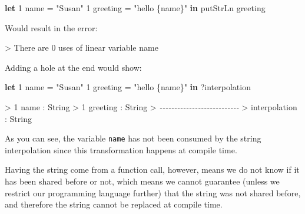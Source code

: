\documentclass[
]{article}
\newenvironment{Shaded}{}{}
\newcommand{\CommentTok}[1]{\textcolor[rgb]{0.38,0.63,0.69}{\textit{#1}}}
\newcommand{\DataTypeTok}[1]{\textcolor[rgb]{0.56,0.13,0.00}{#1}}
\newcommand{\DecValTok}[1]{\textcolor[rgb]{0.25,0.63,0.44}{#1}}
\newcommand{\FunctionTok}[1]{\textcolor[rgb]{0.02,0.16,0.49}{#1}}
\newcommand{\KeywordTok}[1]{\textcolor[rgb]{0.00,0.44,0.13}{\textbf{#1}}}
\newcommand{\NormalTok}[1]{#1}
\newcommand{\OperatorTok}[1]{\textcolor[rgb]{0.40,0.40,0.40}{#1}}
\newcommand{\OtherTok}[1]{\textcolor[rgb]{0.00,0.44,0.13}{#1}}
\newcommand{\StringTok}[1]{\textcolor[rgb]{0.25,0.44,0.63}{#1}}
\begin{document}
\begin{Shaded}
\begin{Highlighting}[]
\KeywordTok{let} \DecValTok{1}\NormalTok{ name }\OtherTok{=} \StringTok{"Susan"}
    \DecValTok{1}\NormalTok{ greeting }\OtherTok{=} \StringTok{"hello \{name\}"} \KeywordTok{in}
    \FunctionTok{putStrLn}\NormalTok{ greeting}
\end{Highlighting}
\end{Shaded}

Would result in the error:

\begin{Shaded}
\begin{Highlighting}[]
\OperatorTok{\textgreater{}}\NormalTok{ There are }\DecValTok{0}\NormalTok{ uses of linear variable name}
\end{Highlighting}
\end{Shaded}

Adding a hole at the end would show:

\begin{Shaded}
\begin{Highlighting}[]
\KeywordTok{let} \DecValTok{1}\NormalTok{ name }\OtherTok{=} \StringTok{"Susan"}
    \DecValTok{1}\NormalTok{ greeting }\OtherTok{=} \StringTok{"hello \{name\}"} \KeywordTok{in}
    \OperatorTok{?}\NormalTok{interpolation}
\end{Highlighting}
\end{Shaded}

\begin{Shaded}
\begin{Highlighting}[]
\OperatorTok{\textgreater{}} \DecValTok{1}\NormalTok{ name }\OperatorTok{:} \DataTypeTok{String}
\OperatorTok{\textgreater{}} \DecValTok{1}\NormalTok{ greeting }\OperatorTok{:} \DataTypeTok{String}
\OperatorTok{\textgreater{}} \CommentTok{{-}{-}{-}{-}{-}{-}{-}{-}{-}{-}{-}{-}{-}{-}{-}{-}{-}{-}{-}{-}{-}{-}{-}{-}{-}{-}{-}}
\OperatorTok{\textgreater{}}\NormalTok{ interpolation }\OperatorTok{:} \DataTypeTok{String}
\end{Highlighting}
\end{Shaded}

As you can see, the variable \texttt{name} has not been consumed by the
string interpolation since this transformation happens at compile time.

Having the string come from a function call, however, means we do not
know if it has been shared before or not, which means we cannot
guarantee (unless we restrict our programming language further) that the
string was not shared before, and therefore the string cannot be
replaced at compile time.
\end{document}
